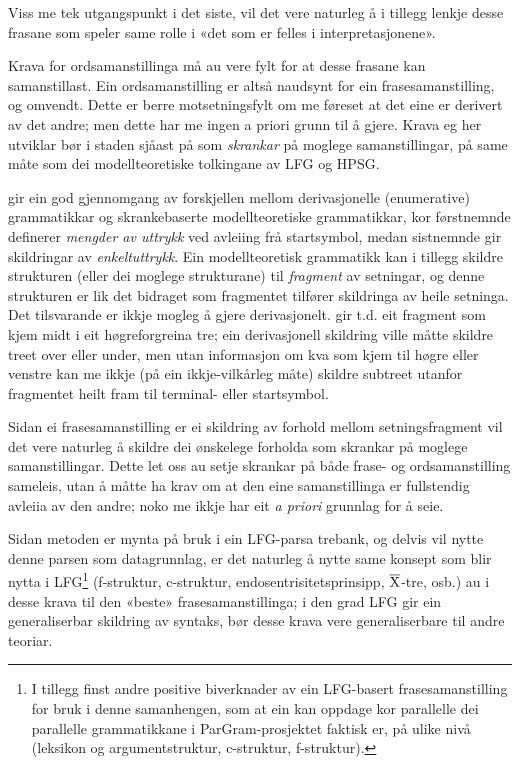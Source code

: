 \documentclass[11pt,a4paper,oneside,draft]{book}
\newcommand{\xbar}{$\rm\overline{X}$}
\begin{document}
Viss me tek utgangspunkt i det siste, vil det vere naturleg å i
tillegg lenkje desse frasane som speler same rolle i «det som er
felles i interpretasjonene».

Krava for ordsamanstillinga må au vere fylt for at desse frasane kan
samanstillast. Ein ordsamanstilling er altså naudsynt for ein
frasesamanstilling, og omvendt. Dette er berre motsetningsfylt om me
føreset at det eine er derivert av det andre; men dette har me ingen a
priori grunn til å gjere. Krava eg her utviklar bør i staden sjåast på
som \emph{skrankar} på moglege samanstillingar, på same måte som dei
modellteoretiske tolkingane av LFG og HPSG.

\citet{pullum2001dbm} gir ein god gjennomgang av forskjellen
mellom derivasjonelle (enumerative) grammatikkar og skrankebaserte
modellteoretiske grammatikkar, kor førstnemnde definerer \emph{mengder av uttrykk} ved avleiing frå startsymbol, medan sistnemnde gir skildringar
av \emph{enkeltuttrykk}. Ein modellteoretisk grammatikk kan i tillegg skildre
strukturen (eller dei moglege strukturane) til \emph{fragment} av setningar,
og denne strukturen er lik det bidraget som fragmentet tilfører
skildringa av heile setninga. Det tilsvarande er ikkje mogleg å gjere
derivasjonelt. \citet[s.~32--33]{pullum2001dbm} gir t.d. eit fragment
som kjem midt i eit høgreforgreina tre; ein derivasjonell skildring
ville måtte skildre treet over eller under, men utan informasjon om
kva som kjem til høgre eller venstre kan me ikkje (på ein
ikkje-vilkårleg måte) skildre subtreet utanfor fragmentet heilt fram
til terminal- eller startsymbol. 

Sidan ei frasesamanstilling er ei skildring av forhold mellom
setningsfragment vil det vere naturleg å skildre dei ønskelege
forholda som skrankar på moglege samanstillingar. Dette let oss au
setje skrankar på både frase- og ordsamanstilling sameleis, utan å
måtte ha krav om at den eine samanstillinga er fullstendig avleiia av
den andre; noko me ikkje har eit \emph{a priori} grunnlag for å seie. 

Sidan metoden er mynta på bruk i ein LFG-parsa trebank, og delvis vil
nytte denne parsen som datagrunnlag, er det naturleg å nytte same
konsept som blir nytta i LFG\footnote{I tillegg finst andre positive biverknader av ein LFG-basert
 frasesamanstilling for bruk i denne samanhengen, som at ein kan
 oppdage kor parallelle dei parallelle grammatikkane i
 ParGram-prosjektet \citep{butt2002pgp} faktisk er, på ulike nivå
 (leksikon og argumentstruktur, c-struktur, f-struktur). } (f-struktur, c-struktur,
endosentrisitetsprinsipp, \xbar{}-tre, osb.)  au i desse krava til den
«beste» frasesamanstillinga; i den grad LFG gir ein generaliserbar
skildring av syntaks, bør desse krava vere generaliserbare til andre
teoriar.
\end{document}
